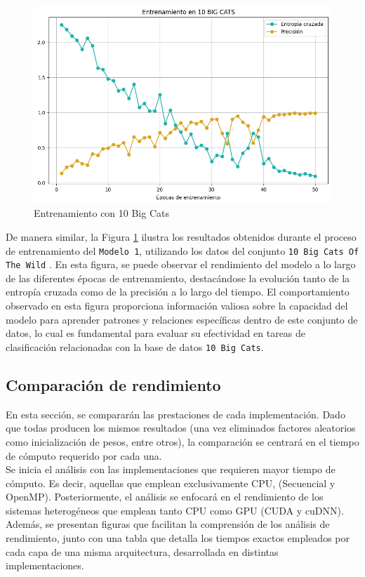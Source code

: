 \begin{figure}[H]
	\centering
	\includegraphics[scale=0.5]{imagenes/10_big_cats.png}  
	\caption{Entrenamiento con 10 Big Cats}
	\label{fig:10_big_cats}
\end{figure}

De manera similar, la Figura \ref{fig:10_big_cats} ilustra los resultados obtenidos durante el proceso de entrenamiento del \texttt{Modelo 1}, utilizando los datos del conjunto \texttt{10 Big Cats Of The Wild} \cite{10_big_cats}. En esta figura, se puede observar el rendimiento del modelo a lo largo de las diferentes épocas de entrenamiento, destacándose la evolución tanto de la entropía cruzada como de la precisión a lo largo del tiempo. El comportamiento observado en esta figura proporciona información valiosa sobre la capacidad del modelo para aprender patrones y relaciones específicas dentro de este conjunto de datos, lo cual es fundamental para evaluar su efectividad en tareas de clasificación relacionadas con la base de datos \texttt{10 Big Cats}.

\subsection{Comparación de rendimiento}

En esta sección, se compararán las prestaciones de cada implementación. Dado que todas producen los mismos resultados (una vez eliminados factores aleatorios como inicialización de pesos, entre otros), la comparación se centrará en el tiempo de cómputo requerido por cada una. \\
Se inicia el análisis con las implementaciones que requieren mayor tiempo de cómputo. Es decir, aquellas que emplean exclusivamente CPU, (Secuencial y OpenMP). Posteriormente, el análisis se enfocará en el rendimiento de los sistemas heterogéneos que emplean tanto CPU como GPU (CUDA y cuDNN). \\
Además, se presentan figuras que facilitan la comprensión  de los análisis de rendimiento, junto con una tabla que detalla los tiempos exactos empleados por cada capa de una misma arquitectura, desarrollada en distintas implementaciones.

